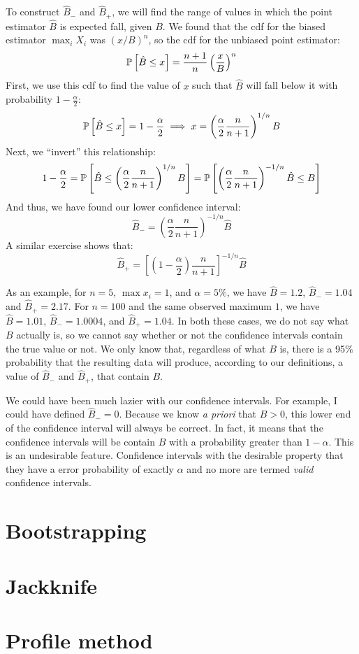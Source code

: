 To construct $\hat{B}_-$ and $\hat{B}_+$, we will find the range of values in which the point
estimator $\hat{B}$ is expected fall, given $B$. We found that the cdf for the biased
estimator $\max_i X_i$ was $(x/B)^n$, so the cdf for the
unbiased point estimator:
\begin{equation*}
    \mathbb{P}\left[{\hat{B} \leq x}\right] = \frac{n+1}{n} \left(\frac{x}{B}\right)^n
\end{equation*}
First, we use this cdf to find the value of $x$ such that $\hat{B}$ will fall below it
with probability $1-\frac{\alpha}{2}$:
\begin{equation*}
    \mathbb{P}\left[{\hat{B} \leq x}\right] = 1 - \frac{\alpha}{2} \implies x = \left( \frac{\alpha}{2} \frac{n}{n+1}\right)^{1/n} B
\end{equation*}
Next, we ``invert'' this relationship:
\begin{equation*}
    1 - \frac{\alpha}{2}
    = \mathbb{P}\left[{\hat{B} \leq \left( \frac{\alpha}{2} \frac{n}{n+1}\right)^{1/n} B}\right]
    = \mathbb{P}\left[{\left( \frac{\alpha}{2} \frac{n}{n+1}\right)^{-1/n} \hat{B} \leq B}\right]
\end{equation*}
And thus, we have found our lower confidence interval:
\begin{equation*}
    \hat{B}_- = \left( \frac{\alpha}{2} \frac{n}{n+1}\right)^{-1/n} \hat{B}
\end{equation*}
A similar exercise shows that:
\begin{equation*}
    \hat{B}_+ = \left[ \left(1- \frac{\alpha}{2}\right) \frac{n}{n+1}\right]^{-1/n} \hat{B}
\end{equation*}

As an example, for $n=5$, $\max x_i = 1$, and $\alpha = 5\%$, we have $\hat{B} = 1.2$, $\hat{B}_- = 1.04$ and $\hat{B}_+ = 2.17$. For $n=100$ and the same observed maximum $1$,
we have $\hat{B} = 1.01$,
$\hat{B}_- = 1.0004$, and $\hat{B}_+ = 1.04$. In both these cases, we do not say what $B$
actually is, so we cannot say whether or not the confidence intervals contain the true value
or not. We only know that, regardless of what $B$ is, there is a 95\% probability that the
resulting data will produce, according to our definitions, a value of $\hat{B}_-$ and
$\hat{B}_+$, that contain $B$.

We could have been much lazier with our confidence intervals. For example, I could have
defined $\hat{B}_- = 0$. Because we know \textit{a priori} that $B>0$, this lower end
of the confidence interval will always be correct. In fact, it means that the confidence
intervals will be contain $B$ with a probability greater than $1-\alpha$. This is an
undesirable feature. Confidence intervals with the desirable property that they have a
error probability of exactly $\alpha$ and no more are termed \emph{valid} confidence intervals.

\section{Bootstrapping}

\section{Jackknife}

\section{Profile method}
